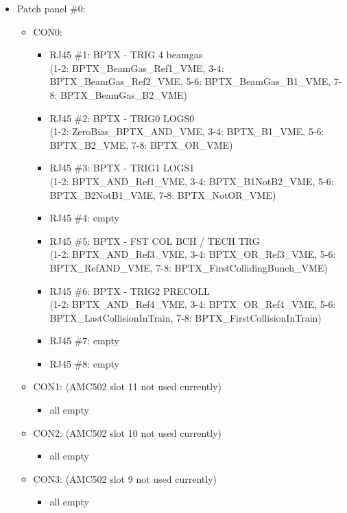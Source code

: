 \begin{itemize}
\item \small Patch panel \#0:
\begin{itemize}
\item \small CON0:
\begin{itemize}
    \item \small RJ45 \#1: BPTX - TRIG 4 beamgas \\\tiny{(1-2: BPTX\_BeamGas\_Ref1\_VME, 3-4: BPTX\_BeamGas\_Ref2\_VME, 5-6: BPTX\_BeamGas\_B1\_VME, 7-8: BPTX\_BeamGas\_B2\_VME)}\normalsize
    \item \small RJ45 \#2: BPTX - TRIG0 LOGS0 \\\tiny{(1-2: ZeroBias\_BPTX\_AND\_VME, 3-4: BPTX\_B1\_VME, 5-6: BPTX\_B2\_VME, 7-8: BPTX\_OR\_VME)}\normalsize
    \item \small RJ45 \#3: BPTX - TRIG1 LOGS1 \\\tiny{(1-2: BPTX\_AND\_Ref1\_VME, 3-4: BPTX\_B1NotB2\_VME, 5-6: BPTX\_B2NotB1\_VME, 7-8: BPTX\_NotOR\_VME)}\normalsize
    \item \small RJ45 \#4: empty
    \item \small RJ45 \#5: BPTX - FST COL BCH  / TECH TRG \\\tiny{(1-2: BPTX\_AND\_Ref3\_VME, 3-4: BPTX\_OR\_Ref3\_VME, 5-6: BPTX\_RefAND\_VME, 7-8: BPTX\_FirstCollidingBunch\_VME)}\normalsize
    \item \small RJ45 \#6: BPTX - TRIG2 PRECOLL \\\tiny{(1-2: BPTX\_AND\_Ref4\_VME, 3-4: BPTX\_OR\_Ref4\_VME, 5-6: BPTX\_LastCollisionInTrain, 7-8: BPTX\_FirstCollisionInTrain)}\normalsize
    \item \small RJ45 \#7: empty
    \item \small RJ45 \#8: empty
\end{itemize}
\item \small CON1: (AMC502 slot 11 not used currently)
\begin{itemize}
    \item all empty
\end{itemize}
\item \small CON2: (AMC502 slot 10 not used currently)
\begin{itemize}
    \item all empty
\end{itemize}
\item \small CON3: (AMC502 slot 9 not used currently)
\begin{itemize}
    \item all empty

\end{itemize}
\end{itemize}
\end{itemize}
